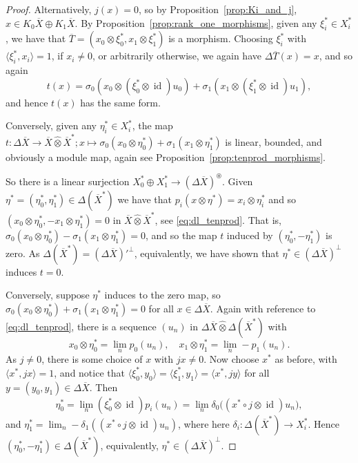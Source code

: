 \documentclass[a4paper,11pt]{article}
\theoremstyle{plain}
\theoremstyle{remark}
\newcommand{\ip}[2]{{\langle {#1} , {#2} \rangle}}
\newcommand{\id}{\operatorname{id}}
\newcommand{\proten}{\widehat\otimes}
\newcommand{\intdual}{\circledast}
\begin{document}
\begin{proof}
Alternatively, $j(x)=0$, so by Proposition~\ref{prop:Ki_and_j}, $x\in K_0\overline X \oplus K_1\overline X$.  By Proposition~\ref{prop:rank_one_morphisms}, given any $\xi_i^*\in X_i^*$, we have that $\overline T = (x_0\otimes\xi_0^*, x_1\otimes\xi_1^*)$ is a morphism.  Choosing $\xi_i^*$ with $\ip{\xi_i^*}{x_i}=1$, if $x_i\not=0$, or arbitrarily otherwise, we again have $\Delta \overline T(x) = x$, and so again
\[ t(x) = \sigma_0(x_0 \otimes (\xi_0^*\otimes\id)u_0) + \sigma_1(x_1\otimes (\xi_1^*\otimes\id)u_1), \]
and hence $t(x)$ has the same form.

Conversely, given any $\eta_i^*\in X_i^*$, the map $t\colon \Delta\overline X \to \overline X\proten \overline X^*; x \mapsto \sigma_0(x_0\otimes\eta_0^*) + \sigma_1(x_1\otimes\eta_1^*)$ is linear, bounded, and obviously a module map, again see Proposition~\ref{prop:tenprod_morphisms}.


So there is a linear surjection $X_0^* \oplus X_1^* \to (\Delta\overline X)^\intdual$.  Given $\eta^* = (\eta_0^*,\eta_1^*) \in \Delta(\overline X^*)$ we have that $p_i(x\otimes\eta^*) = x_i \otimes \eta_i^*$ and so $(x_0\otimes\eta_0^*, -x_1\otimes\eta_1^*) = 0$ in $\overline X \proten \overline X^*$, see \eqref{eq:dl_tenprod}.  That is, $\sigma_0(x_0\otimes\eta_0^*) - \sigma_1(x_1\otimes\eta_1^*) = 0$, and so the map $t$ induced by $(\eta_0^*, -\eta_1^*)$ is zero.  As 
$\Delta(\overline X^*) = (\Delta\overline X)'^\perp$, equivalently, we have shown that $\eta^* \in (\Delta\overline X)^\perp$ induces $t=0$.

Conversely, suppose $\eta^*$ induces to the zero map, so $\sigma_0(x_0\otimes\eta_0^*) + \sigma_1(x_1\otimes\eta_1^*) = 0$ for all $x\in\Delta\overline X$.  Again with reference to \eqref{eq:dl_tenprod}, there is a sequence $(u_n)$ in $\Delta\overline X \proten \Delta(\overline X^*)$ with
\[ x_0\otimes\eta_0^* = \lim_n p_0(u_n), \quad
x_1\otimes\eta_1^* = \lim_n -p_1(u_n). \]
As $j\not=0$, there is some choice of $x$ with $jx\not=0$.  Now choose $x^*$ as before, with $\ip{x^*}{jx} = 1$, and notice that $\ip{\xi_0^*}{y_0} = \ip{\xi_1^*}{y_1} = \ip{x^*}{jy}$ for all $y=(y_0,y_1)\in\Delta\overline X$.   Then
\[ \eta_0^* = \lim_n (\xi_0^*\otimes\id)p_i(u_n) = \lim_n \delta_0\big( (x^*\circ j\otimes\id)u_n \big), \]
and $\eta_1^* = \lim_n -\delta_1( (x^*\circ j\otimes\id)u_n )$, where here $\delta_i \colon \Delta(\overline X^*) \to X_i^*$.  Hence $(\eta_0^*, -\eta_1^*) \in \Delta(\overline X^*)$, equivalently, $\eta^* \in (\Delta\overline X)^\perp$.


\end{proof}
\end{document}

